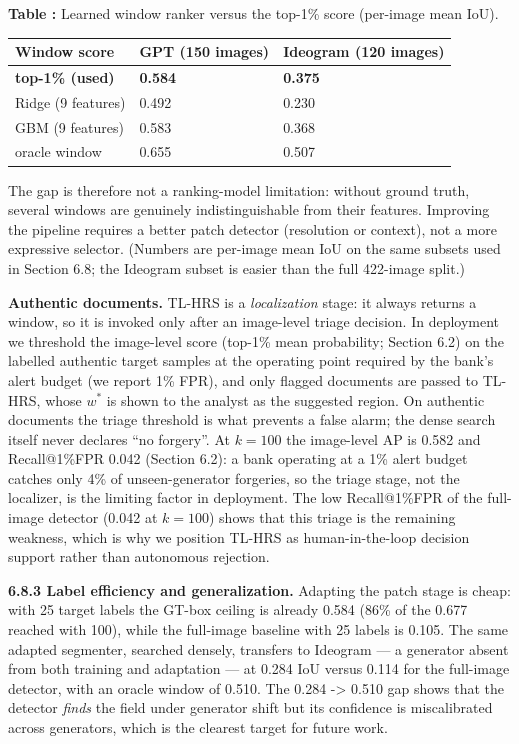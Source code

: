 \documentclass[preprint,12pt]{elsarticle}
\newcounter{tabno}
\newcommand{\tabcaption}[1]{\par\needspace{9\baselineskip}\refstepcounter{tabno}\noindent\textbf{Table \thetabno:} #1\par\vspace{2pt}}
\begin{document}
{
\tabcaption{Learned window ranker versus the top-1\% score (per-image mean IoU).}\label{tab:ranker}
\begin{longtable}[]{@{}lll@{}}
\toprule\noalign{}
Window score & GPT (150 images) & Ideogram (120 images) \\
\midrule\noalign{}
\endhead
\bottomrule\noalign{}
\endlastfoot
\textbf{top-1\% (used)} & \textbf{0.584} & \textbf{0.375} \\
Ridge (9 features) & 0.492 & 0.230 \\
GBM (9 features) & 0.583 & 0.368 \\
oracle window & 0.655 & 0.507 \\
\end{longtable}
}

The gap is therefore not a ranking-model limitation: without ground truth, several windows are genuinely indistinguishable from their features. Improving the pipeline requires a better patch detector (resolution or context), not a more expressive selector. (Numbers are per-image mean IoU on the same subsets used in Section 6.8; the Ideogram subset is easier than the full 422-image split.)

\textbf{Authentic documents.} TL-HRS is a \emph{localization} stage: it always returns a window, so it is invoked only after an image-level triage decision. In deployment we threshold the image-level score (top-1\% mean probability; Section 6.2) on the labelled authentic target samples at the operating point required by the bank's alert budget (we report 1\% FPR), and only flagged documents are passed to TL-HRS, whose $w^*$ is shown to the analyst as the suggested region. On authentic documents the triage threshold is what prevents a false alarm; the dense search itself never declares ``no forgery''. At $k=100$ the image-level AP is 0.582 and Recall@1\%FPR 0.042 (Section 6.2): a bank operating at a 1\% alert budget catches only 4\% of unseen-generator forgeries, so the triage stage, not the localizer, is the limiting factor in deployment. The low Recall@1\%FPR of the full-image detector (0.042 at $k=100$) shows that this triage is the remaining weakness, which is why we position TL-HRS as human-in-the-loop decision support rather than autonomous rejection.

\textbf{6.8.3 Label efficiency and generalization.} Adapting the patch stage is cheap: with 25 target labels the GT-box ceiling is already 0.584 (86\% of the 0.677 reached with 100), while the full-image baseline with 25 labels is 0.105. The same adapted segmenter, searched densely, transfers to Ideogram --- a generator absent from both training and adaptation --- at 0.284 IoU versus 0.114 for the full-image detector, with an oracle window of 0.510. The 0.284 -\textgreater{} 0.510 gap shows that the detector \emph{finds} the field under generator shift but its confidence is miscalibrated across generators, which is the clearest target for future work.
\end{document}
